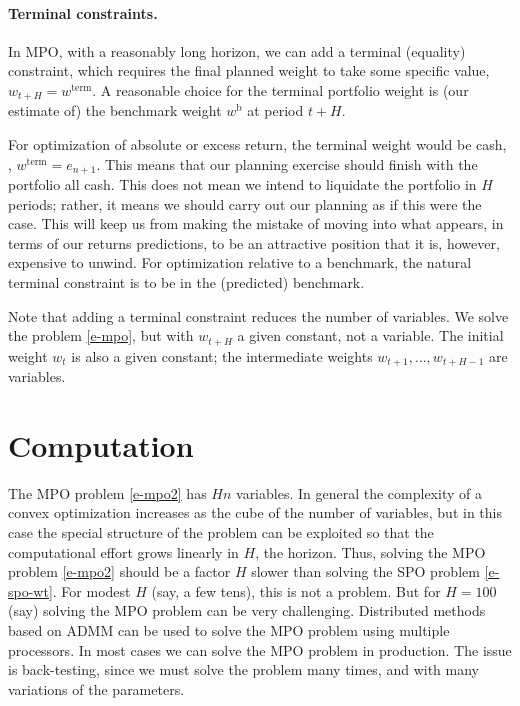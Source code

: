 \documentclass[openany]{now}
\newcommand{\wb}{w^\mathrm{b}}
\begin{document}
\paragraph{Terminal constraints.}
In MPO, with a reasonably long horizon, we can add a terminal (equality) constraint,
which requires the final planned weight to take some specific value,
$w_{t+H}=w^\mathrm{term}$.
A reasonable choice for the terminal portfolio weight is (our estimate of)
the benchmark weight $\wb$ at period $t+H$.

For optimization of absolute or excess return, the terminal
weight would be cash, \ie, $w^\mathrm{term} = e_{n+1}$.
This means that our planning exercise should finish with the portfolio
all cash.  This does not mean we intend to liquidate the portfolio
in $H$ periods; rather, it means we should carry out our planning
as if this were the case.   This will keep us from making the mistake
of moving into what appears, in terms of our returns predictions, to be
an attractive position that it is, however, expensive to unwind.
For optimization relative to a benchmark, the natural terminal constraint
is to be in the (predicted) benchmark.

Note that adding a terminal constraint reduces the number of variables.
We solve the problem \eqref{e-mpo}, but with $w_{t+H}$ a given constant,
not a variable.
The initial weight $w_t$ is also a given constant;
the intermediate weights $w_{t+1}, \ldots, w_{t+H-1}$ are variables.


\section{Computation}\label{s-mpo-computation}
The MPO problem \eqref{e-mpo2} has $Hn$ variables.  In general the complexity
of a convex optimization increases as the cube of the number of variables,
but in this case the special structure of the problem can be exploited
so that the computational effort grows linearly in $H$, the horizon.
Thus, solving the MPO problem \eqref{e-mpo2} should be a factor $H$ slower than
solving the SPO problem \eqref{e-spo-wt}.
For modest $H$ (say, a few tens), this is not a problem.
But for $H=100$ (say) solving the MPO problem can be very challenging.
Distributed methods based on ADMM \cite{boyd2011distributed,boyd2014performance} can be used
to solve the MPO problem using multiple processors.
In most cases we can solve the MPO problem in production.
The issue is back-testing, since we must solve the problem many times,
and with many variations of the parameters.
\end{document}
